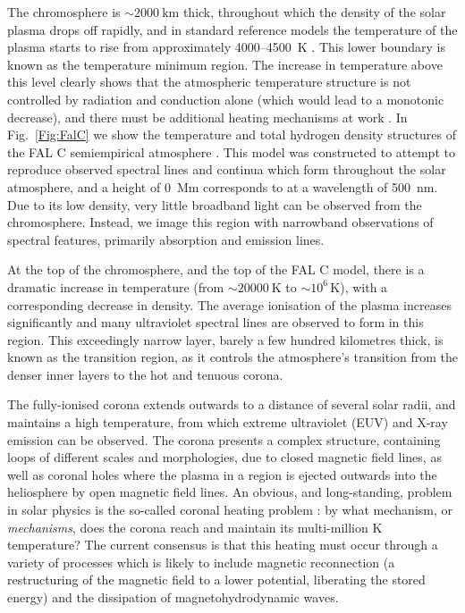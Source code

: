 The chromosphere is $\sim\SI{2000}{\kilo\m}$ thick, throughout which the density of the solar plasma drops off rapidly, and in standard reference models the temperature of the plasma starts to rise from approximately 4000--\SI{4500}{\kelvin} \citep{Vernazza1981,Solanki2004}.
This lower boundary is known as the temperature minimum region.
The increase in temperature above this level clearly shows that the atmospheric temperature structure is not controlled by radiation and conduction alone (which would lead to a monotonic decrease), and there must be additional heating mechanisms at work \citep{Gurman1992}.
In Fig.~\ref{Fig:FalC} we show the temperature and total hydrogen density structures of the FAL C semiempirical atmosphere \citep{Fontenla1993}.
This model was constructed to attempt to reproduce observed spectral lines and continua which form throughout the solar atmosphere, and a height of \SI{0}{\mega\m} corresponds to  at a wavelength of \SI{500}{\nano\m}.
Due to its low density, very little broadband light can be observed from the chromosphere.
Instead, we image this region with narrowband observations of spectral features, primarily absorption and emission lines.

At the top of the chromosphere, and the top of the FAL C model, there is a dramatic increase in temperature (from $\sim\SI{20 000}{\kelvin}$ to $\sim 10^6\,\si{\kelvin}$), with a corresponding decrease in density.
The average ionisation of the plasma increases significantly and many ultraviolet spectral lines are observed to form in this region.
This exceedingly narrow layer, barely a few hundred kilometres thick, is known as the transition region, as it controls the atmosphere's transition from the denser inner layers to the hot and tenuous corona.

The fully-ionised corona extends outwards to a distance of several solar radii, and maintains a high temperature, from which extreme ultraviolet (EUV) and X-ray emission can be observed.
The corona presents a complex structure, containing loops of different scales and morphologies, due to closed magnetic field lines, as well as coronal holes where the plasma in a region is ejected outwards into the heliosphere by open magnetic field lines.
An obvious, and long-standing, problem in solar physics is the so-called coronal heating problem \citep[reviewed by][]{Klimchuk2006}: by what mechanism, or \emph{mechanisms}, does the corona reach and maintain its multi-million \si{\kelvin} temperature?
The current consensus \citep[][ and references therein]{DeMoortel2015} is that this heating must occur through a variety of processes which is likely to include magnetic reconnection (a restructuring of the magnetic field to a lower potential, liberating the stored energy) and the dissipation of magnetohydrodynamic waves.

